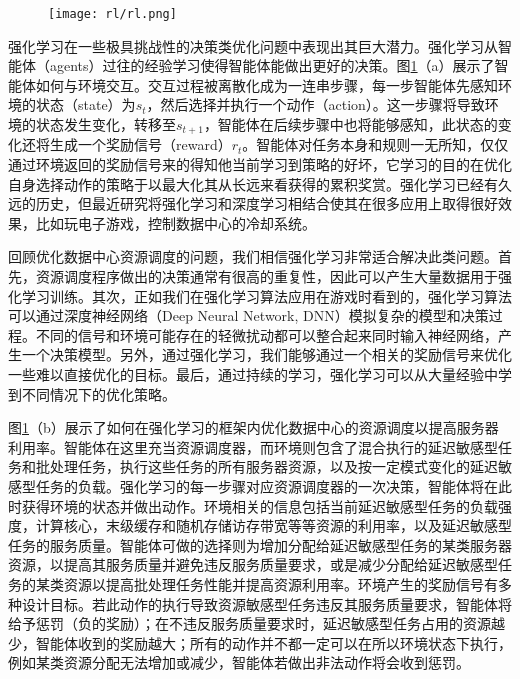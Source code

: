 \begin{figure}
  \centering
  \begin{minipage}[b]{0.7\textwidth}
    \centering
    \texttt{[image: rl/rl.png]}
    \label{fig:rl}
  \end{minipage}     
\end{figure}


强化学习在一些极具挑战性的决策类优化问题中表现出其巨大潜力\cite{mnih2013playing}\cite{silver2016mastering}。强化学习从智能体（agents）过往的经验学习使得智能体能做出更好的决策。图\ref{fig:rl}（a）展示了智能体如何与环境交互。交互过程被离散化成为一连串步骤，每一步智能体先感知环境的状态（state）为$s_t$，然后选择并执行一个动作（action）。这一步骤将导致环境的状态发生变化，转移至$s_{t+1}$，智能体在后续步骤中也将能够感知，此状态的变化还将生成一个奖励信号（reward）$r_t$。智能体对任务本身和规则一无所知，仅仅通过环境返回的奖励信号来的得知他当前学习到策略的好坏\cite{bertsekas1995dynamic}，它学习的目的在优化自身选择动作的策略于以最大化其从长远来看获得的累积奖赏。强化学习已经有久远的历史，但最近研究将强化学习和深度学习相结合使其在很多应用上取得很好效果，比如玩电子游戏\cite{mnih2015human}，控制数据中心的冷却系统\cite{evans2016deepmind}。

回顾优化数据中心资源调度的问题，我们相信强化学习非常适合解决此类问题。首先，资源调度程序做出的决策通常有很高的重复性，因此可以产生大量数据用于强化学习训练。其次，正如我们在强化学习算法应用在游戏\cite{mnih2015human}\cite{evans2016deepmind}时看到的，强化学习算法可以通过深度神经网络（Deep Neural Network, DNN）模拟复杂的模型和决策过程。不同的信号和环境可能存在的轻微扰动都可以整合起来同时输入神经网络，产生一个决策模型。另外，通过强化学习，我们能够通过一个相关的奖励信号来优化一些难以直接优化的目标。最后，通过持续的学习，强化学习可以从大量经验中学到不同情况下的优化策略。

图\ref{fig:rl}（b）展示了如何在强化学习的框架内优化数据中心的资源调度以提高服务器利用率。智能体在这里充当资源调度器，而环境则包含了混合执行的延迟敏感型任务和批处理任务，执行这些任务的所有服务器资源，以及按一定模式变化的延迟敏感型任务的负载。强化学习的每一步骤对应资源调度器的一次决策，智能体将在此时获得环境的状态并做出动作。环境相关的信息包括当前延迟敏感型任务的负载强度，计算核心，末级缓存和随机存储访存带宽等等资源的利用率，以及延迟敏感型任务的服务质量。智能体可做的选择则为增加分配给延迟敏感型任务的某类服务器资源，以提高其服务质量并避免违反服务质量要求，或是减少分配给延迟敏感型任务的某类资源以提高批处理任务性能并提高资源利用率。环境产生的奖励信号有多种设计目标。若此动作的执行导致资源敏感型任务违反其服务质量要求，智能体将给予惩罚（负的奖励）；在不违反服务质量要求时，延迟敏感型任务占用的资源越少，智能体收到的奖励越大；所有的动作并不都一定可以在所以环境状态下执行，例如某类资源分配无法增加或减少，智能体若做出非法动作将会收到惩罚。

